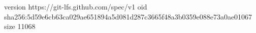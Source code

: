 version https://git-lfs.github.com/spec/v1
oid sha256:5d59e6cb63ca029ae651894a5d081d287c3665f48a3b0359e088e73a0ae01067
size 11068
